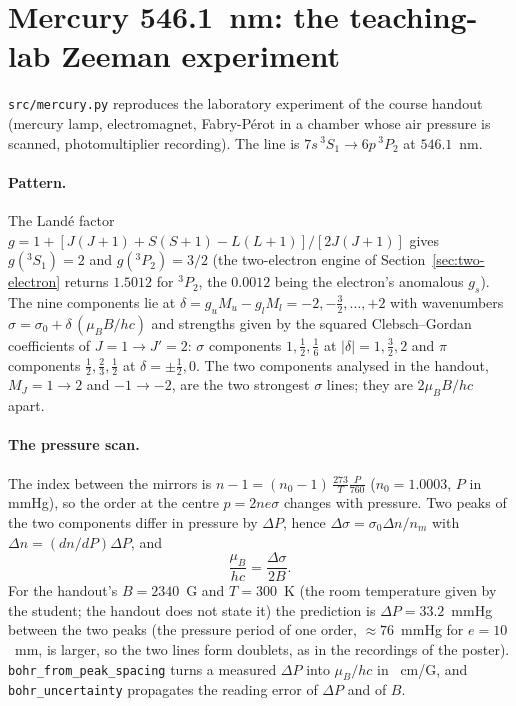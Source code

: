 \section{Mercury 546.1~nm: the teaching-lab Zeeman experiment}
\texttt{src/mercury.py} reproduces the laboratory experiment of the course handout \cite{labtp} (mercury lamp, electromagnet, Fabry-P\'erot in a chamber whose air pressure is scanned, photomultiplier recording). The line is $7s\,^3S_1\to6p\,^3P_2$ at $546.1$~nm.

\paragraph{Pattern.} The Land\'e factor $g=1+[J(J+1)+S(S+1)-L(L+1)]/[2J(J+1)]$ gives $g(^3S_1)=2$ and $g(^3P_2)=3/2$ (the two-electron engine of Section~\ref{sec:two-electron} returns $1.5012$ for $^3P_2$, the $0.0012$ being the electron's anomalous $g_s$). The nine components lie at $\delta=g_uM_u-g_lM_l=-2,-\tfrac32,\dots,+2$ with wavenumbers $\sigma=\sigma_0+\delta\,(\mu_BB/hc)$ and strengths given by the squared Clebsch--Gordan coefficients of $J=1\to J'=2$: $\sigma$ components $1,\tfrac12,\tfrac16$ at $|\delta|=1,\tfrac32,2$ and $\pi$ components $\tfrac12,\tfrac23,\tfrac12$ at $\delta=\pm\tfrac12,0$. The two components analysed in the handout, $M_J=1\to2$ and $-1\to-2$, are the two strongest $\sigma$ lines; they are $2\mu_BB/hc$ apart.

\paragraph{The pressure scan.} The index between the mirrors is $n-1=(n_0-1)\,\tfrac{273}{T}\tfrac{P}{760}$ ($n_0=1.0003$, $P$ in mmHg), so the order at the centre $p=2ne\sigma$ changes with pressure. Two peaks of the two components differ in pressure by $\Delta P$, hence $\Delta\sigma=\sigma_0\Delta n/n_m$ with $\Delta n=(dn/dP)\Delta P$, and
\begin{equation}
\frac{\mu_B}{hc}=\frac{\Delta\sigma}{2B}.
\end{equation}
For the handout's $B=2340$~G and $T=300$~K (the room temperature given by the student; the handout does not state it) the prediction is $\Delta P=33.2$~mmHg between the two peaks (the pressure period of one order, $\approx76$~mmHg for $e=10$~mm, is larger, so the two lines form doublets, as in the recordings of the poster). \texttt{bohr\_from\_peak\_spacing} turns a measured $\Delta P$ into $\mu_B/hc$ in \si{\per\centi\metre}/G, and \texttt{bohr\_uncertainty} propagates the reading error of $\Delta P$ and of $B$.


